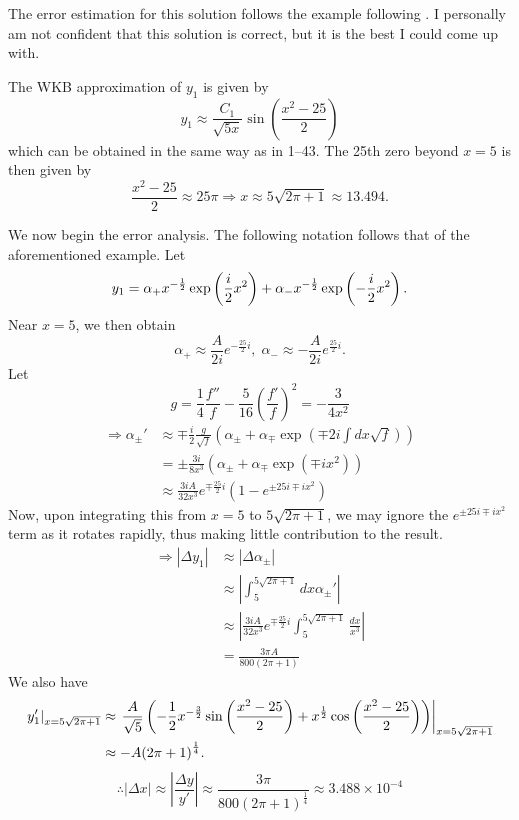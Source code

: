 \item
The error estimation for this solution follows the example following .
I personally am not confident that this solution is correct, but it is the best I could come up with.

The WKB approximation of $y_1$ is given by
\[
	y_1 \approx \frac{C_1}{\sqrt{5x}} \sin\left( \frac{x^2 - 25}{2} \right)
\]
which can be obtained in the same way as in  1--43.
The 25th zero beyond $x = 5$ is then given by
\[
	\frac{x^2 - 25}{2} \approx 25\pi
	\Rightarrow x \approx 5 \sqrt{2\pi + 1} \approx 13.494.
\]

We now begin the error analysis.
The following notation follows that of the aforementioned example.
Let
\[
	y_1 = \alpha_+ x^{-\frac{1}{2}} \exp\left( \frac{i}{2} x^2 \right) + \alpha_- x^{-\frac{1}{2}} \exp\left( -\frac{i}{2} x^2 \right).
\]
Near $x = 5$, we then obtain
\[
	\alpha_+ \approx \frac{A}{2i} e^{-\frac{25}{2}i},\; \alpha_- \approx -\frac{A}{2i} e^{\frac{25}{2}i}.
\]
Let
\[
	g = \frac{1}{4}\frac{f''}{f} - \frac{5}{16}{\left( \frac{f'}{f} \right)}^2
	= -\frac{3}{4x^2}
\]
\begin{align*}
	\Rightarrow \alpha_\pm'
	 & \approx \mp \frac{i}{2}\frac{g}{\sqrt{f}} \left( \alpha_\pm + \alpha_\mp \exp\left( \mp 2i \int dx \sqrt{f} \right) \right) \\
	 & = \pm \frac{3i}{8x^3} \left( \alpha_\pm + \alpha_\mp \exp\left( \mp ix^2 \right) \right)                                    \\
	 & \approx \frac{3iA}{32x^3} e^{\mp \frac{25}{2}i} \left( 1 - e^{\pm 25i \mp ix^2} \right)
\end{align*}
Now, upon integrating this from $x = 5$ to $5 \sqrt{2\pi + 1}$, we may ignore the $e^{\pm 25i \mp ix^2}$ term as it rotates rapidly, thus making little contribution to the result.
\begin{align*}
	\Rightarrow \left| \Delta y_1 \right|
	 & \approx \left| \Delta \alpha_\pm \right|                                                                 \\
	 & \approx \left| \int_5^{5 \sqrt{2\pi + 1}} dx \alpha_\pm' \right|                                         \\
	 & \approx \left| \frac{3iA}{32x^3} e^{\mp \frac{25}{2}i} \int_5^{5 \sqrt{2\pi + 1}} \frac{dx}{x^3} \right| \\
	 & = \frac{3\pi A}{800(2\pi + 1)}
\end{align*}
We also have
\begin{align*}
	\left. y_1' \right|_{x = 5 \sqrt{2\pi + 1}}
	 & \approx \left. \frac{A}{\sqrt{5}} \left( -\frac{1}{2} x^{-\frac{3}{2}} \sin\left( \frac{x^2 - 25}{2} \right) + x^{\frac{1}{2}} \cos\left( \frac{x^2 - 25}{2} \right) \right) \right|_{x = 5 \sqrt{2\pi + 1}} \\
	 & \approx - A {\left( 2\pi + 1 \right)}^{\frac{1}{4}}.
\end{align*}
\[
	\therefore \left| \Delta x \right|
	\approx \left| \frac{\Delta y}{y'} \right|
	\approx \frac{3\pi}{800 {\left( 2\pi + 1 \right)}^{\frac{1}{4}}}
	\approx 3.488 \times 10^{-4}
\]